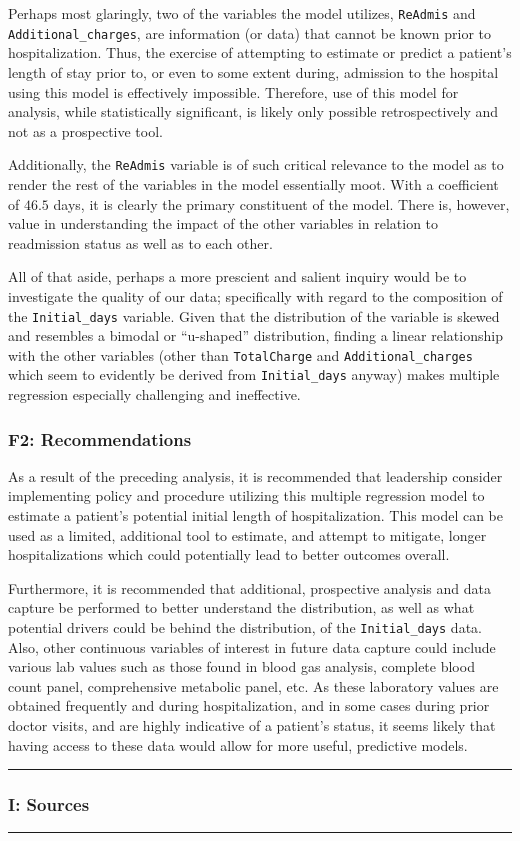 \documentclass[
]{article}
\begin{document}
Perhaps most glaringly, two of the variables the model utilizes,
\texttt{ReAdmis} and \texttt{Additional\_charges}, are information (or
data) that cannot be known prior to hospitalization. Thus, the exercise
of attempting to estimate or predict a patient's length of stay prior
to, or even to some extent during, admission to the hospital using this
model is effectively impossible. Therefore, use of this model for
analysis, while statistically significant, is likely only possible
retrospectively and not as a prospective tool.

Additionally, the \texttt{ReAdmis} variable is of such critical
relevance to the model as to render the rest of the variables in the
model essentially moot. With a coefficient of \(46.5\) days, it is
clearly the primary constituent of the model. There is, however, value
in understanding the impact of the other variables in relation to
readmission status as well as to each other.

All of that aside, perhaps a more prescient and salient inquiry would be
to investigate the quality of our data; specifically with regard to the
composition of the \texttt{Initial\_days} variable. Given that the
distribution of the variable is skewed and resembles a bimodal or
``u-shaped'' distribution, finding a linear relationship with the other
variables (other than \texttt{TotalCharge} and
\texttt{Additional\_charges} which seem to evidently be derived from
\texttt{Initial\_days} anyway) makes multiple regression especially
challenging and ineffective.

\hypertarget{f2-recommendations}{%
\subsubsection{F2: Recommendations}\label{f2-recommendations}}

As a result of the preceding analysis, it is recommended that leadership
consider implementing policy and procedure utilizing this multiple
regression model to estimate a patient's potential initial length of
hospitalization. This model can be used as a limited, additional tool to
estimate, and attempt to mitigate, longer hospitalizations which could
potentially lead to better outcomes overall.

Furthermore, it is recommended that additional, prospective analysis and
data capture be performed to better understand the distribution, as well
as what potential drivers could be behind the distribution, of the
\texttt{Initial\_days} data. Also, other continuous variables of
interest in future data capture could include various lab values such as
those found in blood gas analysis, complete blood count panel,
comprehensive metabolic panel, etc. As these laboratory values are
obtained frequently and during hospitalization, and in some cases during
prior doctor visits, and are highly indicative of a patient's status, it
seems likely that having access to these data would allow for more
useful, predictive models.

\begin{center}\rule{0.5\linewidth}{0.5pt}\end{center}

\hypertarget{i-sources}{%
\subsubsection{I: Sources}\label{i-sources}}

\begin{center}\rule{0.5\linewidth}{0.5pt}\end{center}
\end{document}
